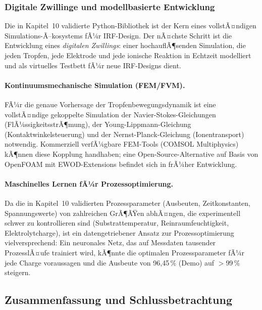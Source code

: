 ﻿\documentclass[a4paper,12pt]{scrreprt}
\theoremstyle{definition}
\begin{document}
\subsubsection{Digitale Zwillinge und modellbasierte Entwicklung}
\label{subsubsec:digital_twin}

Die in Kapitel~10 validierte Python-Bibliothek ist der Kern eines
vollstÃ¤ndigen Simulations-Ã–kosystems fÃ¼r IRF-Design. Der nÃ¤chste
Schritt ist die Entwicklung eines \emph{digitalen Zwillings}:
einer hochauflÃ¶senden Simulation, die jeden Tropfen, jede Elektrode
und jede ionische Reaktion in Echtzeit modelliert und als
virtuelles Testbett fÃ¼r neue IRF-Designs dient.

\paragraph{Kontinuumsmechanische Simulation (FEM/FVM).}
FÃ¼r die genaue Vorhersage der Tropfenbewegungsdynamik ist eine
vollstÃ¤ndige gekoppelte Simulation der Navier-Stokes-Gleichungen
(FlÃ¼ssigkeitsstrÃ¶mung), der Young-Lippmann-Gleichung
(Kontaktwinkelsteuerung) und der Nernst-Planck-Gleichung
(Ionentransport) notwendig. Kommerziell verfÃ¼gbare FEM-Tools
(COMSOL Multiphysics) kÃ¶nnen diese Kopplung handhaben;
eine Open-Source-Alternative auf Basis von OpenFOAM mit
EWOD-Extensions befindet sich in frÃ¼her Entwicklung.

\paragraph{Maschinelles Lernen fÃ¼r Prozessoptimierung.}
Da die in Kapitel~10 validierten Prozessparameter (Ausbeuten,
Zeitkonstanten, Spannungswerte) von zahlreichen GrÃ¶ÃŸen abhÃ¤ngen,
die experimentell schwer zu kontrollieren sind (Substrattemperatur,
Reinraumfeuchtigkeit, Elektrolytcharge), ist ein datengetriebener
Ansatz zur Prozessoptimierung vielversprechend: Ein neuronales Netz,
das auf Messdaten tausender ProzesslÃ¤ufe trainiert wird, kÃ¶nnte
die optimalen Prozessparameter fÃ¼r jede Charge voraussagen und
die Ausbeute von 96,45\,\% (Demo) auf $>99\,\%$ steigern.

\subsection{Zusammenfassung und Schlussbetrachtung}
\label{sec:schluss}
\end{document}
